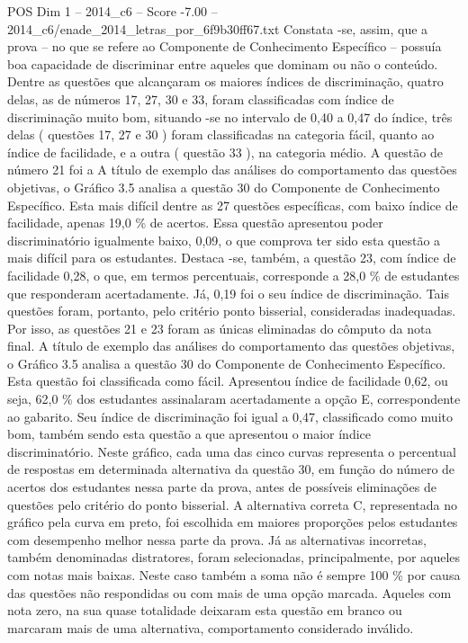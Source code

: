 \begin{textsample}{POS Dim 1 – 2014\_c6 – Score -7.00 – 2014\_c6/enade\_2014\_letras\_por\_6f9b30ff67.txt}
Constata -se, assim, que a prova – no que se refere ao Componente de Conhecimento Específico – possuía boa capacidade de discriminar entre aqueles que dominam ou não o conteúdo.
Dentre as questões que alcançaram os maiores índices de discriminação, quatro delas, as de números 17, 27, 30 e 33, foram classificadas com índice de discriminação muito bom, situando -se no intervalo de 0,40 a 0,47 do índice, três delas ( questões 17, 27 e 30 ) foram classificadas na categoria fácil, quanto ao índice de facilidade, e a outra ( questão 33 ), na categoria médio.
A questão de número 21 foi a A título de exemplo das análises do comportamento das questões objetivas, o Gráfico 3.5 analisa a questão 30 do Componente de Conhecimento Específico.
Esta mais difícil dentre as 27 questões específicas, com baixo índice de facilidade, apenas 19,0 \% de acertos.
Essa questão apresentou poder discriminatório igualmente baixo, 0,09, o que comprova ter sido esta questão a mais difícil para os estudantes.
Destaca -se, também, a questão 23, com índice de facilidade 0,28, o que, em termos percentuais, corresponde a 28,0 \% de estudantes que responderam acertadamente.
Já, 0,19 foi o seu índice de discriminação.
Tais questões foram, portanto, pelo critério ponto bisserial, consideradas inadequadas.
Por isso, as questões 21 e 23 foram as únicas eliminadas do cômputo da nota final.
A título de exemplo das análises do comportamento das questões objetivas, o Gráfico 3.5 analisa a questão 30 do Componente de Conhecimento Específico.
Esta questão foi classificada como fácil.
Apresentou índice de facilidade 0,62, ou seja, 62,0 \% dos estudantes assinalaram acertadamente a opção E, correspondente ao gabarito.
Seu índice de discriminação foi igual a 0,47, classificado como muito bom, também sendo esta questão a que apresentou o maior índice discriminatório.
Neste gráfico, cada uma das cinco curvas representa o percentual de respostas em determinada alternativa da questão 30, em função do número de acertos dos estudantes nessa parte da prova, antes de possíveis eliminações de questões pelo critério do ponto bisserial.
A alternativa correta C, representada no gráfico pela curva em preto, foi escolhida em maiores proporções pelos estudantes com desempenho melhor nessa parte da prova.
Já as alternativas incorretas, também denominadas distratores, foram selecionadas, principalmente, por aqueles com notas mais baixas.
Neste caso também a soma não é sempre 100 \% por causa das questões não respondidas ou com mais de uma opção marcada.
Aqueles com nota zero, na sua quase totalidade deixaram esta questão em branco ou marcaram mais de uma alternativa, comportamento considerado inválido.

\end{textsample}
